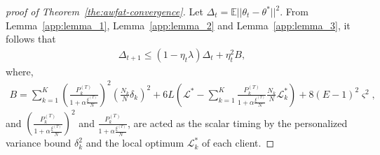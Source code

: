 \documentclass{article} %
\theoremstyle{plain}
\theoremstyle{definition}
\theoremstyle{remark}
\begin{document}
\begin{proof}[proof of Theorem~\ref{the:awfat-convergence}]
Let $\Delta_t=\mathbb{E}||\theta_t-\theta^*||^2$. From Lemma~\ref{app:lemma_1}, Lemma~\ref{app:lemma_2} and Lemma~\ref{app:lemma_3}, it follows that
\begin{align}
    \Delta_{t+1}\leq (1-\eta_t\lambda)\Delta_t+\eta_t^2B,
\end{align}
where,
\begin{align}
    B=\sum_{k=1}^K \left(\frac{P_k^{(T)} }{1+\alpha\frac{\xi^{(T)}}{N} }\right)^2\left(\frac{N_k}{N}\delta_k\right)^2 + 6L\left(\mathcal{L}^{*}-\sum_{k=1}^K \frac{P_k^{(T)} }{1+\alpha\frac{\xi^{(T)}}{N}}\frac{N_k}{N}\mathcal{L}_k^*\right) + 8(E-1)^2\varsigma^2,
\end{align}
and $\left(\frac{P_k^{(T)} }{1+\alpha\frac{\xi^{(T)}}{N} }\right)^2$ and $\frac{P_k^{(T)} }{1+\alpha\frac{\xi^{(T)}}{N}}$, are acted as the scalar timing by the personalized variance bound $\delta_k^2$ and the local optimum $\mathcal{L}^*_k$ of each client.


\end{proof}
\end{document}
